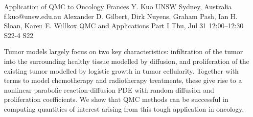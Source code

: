 \begin{talk}
  {Application of QMC to Oncology}%
  {Frances Y. Kuo}%
  {UNSW Sydney, Australia}%
  {f.kuo@unsw.edu.au}%
  {Alexander D. Gilbert, Dirk Nuyens, Graham Pash, Ian H. Sloan, Karen E. Willkox}%
  {QMC and Applications Part I}%
  {Thu, Jul 31 12:00--12:30}%
  {S22-4}%
  {S22}%
    
   
Tumor models largely focus on two key characteristics: infiltration of the tumor into the surrounding healthy tissue modelled by diffusion, and proliferation of the existing tumor modelled by logistic growth in tumor cellularity. Together with terms to model chemotherapy and radiotherapy treatments, these give rise to a nonlinear parabolic reaction-diffusion PDE with random diffusion and proliferation coefficients. We show that QMC methods can be successful in computing quantities of interest arising from this tough application in oncology.

%
%
\end{talk}

